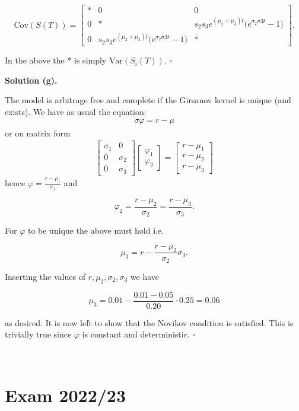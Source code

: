 \documentclass[
]{book}
\begin{document}
\[
\text{Cov}(S(T))=
\begin{bmatrix}
* & 0 & 0\\
0 & * & s_2s_3e^{(\mu_2+\mu_3)t}\Big(e^{\sigma_2\sigma3t}-1\Big)\\
0 & s_2s_3e^{(\mu_2+\mu_3)t}\Big(e^{\sigma_2\sigma3t}-1\Big) & *
\end{bmatrix}.
\]

In the above the * is simply \(\text{Var}(S_i(T))\). \(\square\)

\noindent\makebox[\linewidth]{\rule{\textwidth}{0.4pt}}

\textbf{Solution (g).}

The model is arbitrage free and complete if the Girsanov kernel is unique (and exists). We have as usual the equation:
\begin{align*}
\sigma \varphi=r-\mu
\end{align*}
or on matrix form
\begin{align*}
\begin{bmatrix}
\sigma_1 & 0\\
0 & \sigma_2\\
0 & \sigma_3
\end{bmatrix}
\begin{bmatrix}
\varphi_1\\
\varphi_2
\end{bmatrix}=
\begin{bmatrix}
r- \mu_1 \\
r- \mu_2\\
r-\mu_3
\end{bmatrix}
\end{align*}
hence \(\varphi =\frac{r-\mu_1}{\sigma_1}\) and

\[
\varphi_2=\frac{r-\mu_2}{\sigma_2}=\frac{r-\mu_3}{\sigma_3}.
\]

For \(\varphi\) to be unique the above must hold i.e.

\[
\mu_3=r-\frac{r-\mu_2}{\sigma_2}\sigma_3.
\]

Inserting the values of \(r,\mu_2,\sigma_2,\sigma_3\) we have

\[
\mu_3=0.01-\frac{0.01-0.05}{0.20}\cdot 0.25=0.06
\]

as desired. It is now left to show that the Novikov condition is satisfied. This is trivially true since \(\varphi\) is constant and deterministic. \(\square\)

\noindent\makebox[\linewidth]{\rule{\textwidth}{0.4pt}}\\
\pagebreak

\hypertarget{exam-202223}{%
\section{Exam 2022/23}\label{exam-202223}}
\end{document}

